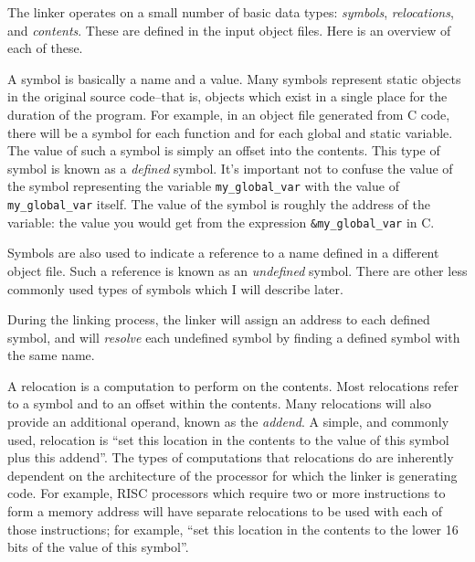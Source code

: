 The linker operates on a small number of basic data types:
\emph{symbols}, \emph{relocations}, and \emph{contents}. These are
defined in the input object files. Here is an overview of each of these.

A symbol is basically a name and a value. Many symbols represent static
objects in the original source code–that is, objects which exist in a
single place for the duration of the program. For example, in an object
file generated from C code, there will be a symbol for each function
and for each global and static variable. The value of such a symbol is
simply an offset into the contents. This type of symbol is known as a
\emph{defined} symbol. It's important not to confuse the value of the
symbol representing the variable \texttt{my\_global\_var} with the
value of \texttt{my\_global\_var} itself. The value of the symbol
is roughly the address of the variable: the value you would get from the
expression \texttt{\&my\_global\_var} in C.

Symbols are also used to indicate a reference to a name defined in a
different object file. Such a reference is known as an \emph{undefined}
symbol. There are other less commonly used types of symbols which I will
describe later.

During the linking process, the linker will assign an address to each
defined symbol, and will \emph{resolve} each undefined symbol by finding
a defined symbol with the same name.

A relocation is a computation to perform on the contents. Most
relocations refer to a symbol and to an offset within the contents.
Many relocations will also provide an additional operand, known as
the \emph{addend}. A simple, and commonly used, relocation is ``set
this location in the contents to the value of this symbol plus this
addend''. The types of computations that relocations do are inherently
dependent on the architecture of the processor for which the linker is
generating code. For example, RISC processors which require two or more
instructions to form a memory address will have separate relocations
to be used with each of those instructions; for example, ``set this
location in the contents to the lower 16 bits of the value of this
symbol''.

